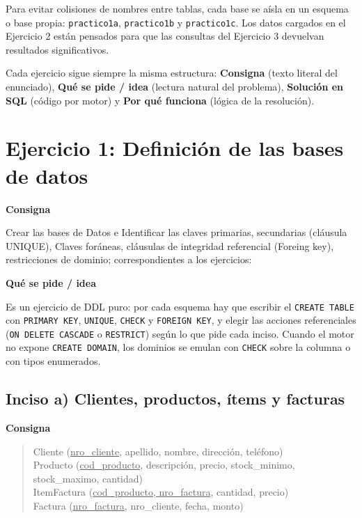 \documentclass[11pt,a4paper]{article}
\newcommand{\itemcabecera}[1]{\noindent\textbf{#1}\par\medskip}
\newcommand{\bloqueConsigna}{\itemcabecera{Consigna}}
\newcommand{\bloqueIdea}{\itemcabecera{Qu\'e se pide / idea}}
\newenvironment{esquema}{%
    \begin{quote}\ttfamily\small\setlength{\parskip}{0pt}\setlength{\parindent}{0pt}%
}{\end{quote}}
\begin{document}
Para evitar colisiones de nombres entre tablas, cada base se aísla en un esquema o base propia: \texttt{practico1a}, \texttt{practico1b} y \texttt{practico1c}. Los datos cargados en el Ejercicio 2 están pensados para que las consultas del Ejercicio 3 devuelvan resultados significativos.

Cada ejercicio sigue siempre la misma estructura: \textbf{Consigna} (texto literal del enunciado), \textbf{Qué se pide / idea} (lectura natural del problema), \textbf{Solución en SQL} (código por motor) y \textbf{Por qué funciona} (lógica de la resolución).

\section{Ejercicio 1: Definición de las bases de datos}

\bloqueConsigna

Crear las bases de Datos e Identificar las claves primarias, secundarias (cláusula UNIQUE), Claves foráneas, cláusulas de integridad referencial (Foreing key), restricciones de dominio; correspondientes a los ejercicios:

\bloqueIdea

Es un ejercicio de DDL puro: por cada esquema hay que escribir el \texttt{CREATE TABLE} con \texttt{PRIMARY KEY}, \texttt{UNIQUE}, \texttt{CHECK} y \texttt{FOREIGN KEY}, y elegir las acciones referenciales (\texttt{ON DELETE CASCADE} o \texttt{RESTRICT}) según lo que pide cada inciso. Cuando el motor no expone \texttt{CREATE DOMAIN}, los dominios se emulan con \texttt{CHECK} sobre la columna o con tipos enumerados.

\subsection{Inciso a) Clientes, productos, ítems y facturas}

\bloqueConsigna

\begin{esquema}
Cliente (\underline{nro\_cliente}, apellido, nombre, direcci\'on, tel\'efono)\\
Producto (\underline{cod\_producto}, descripci\'on, precio, stock\_minimo, stock\_maximo, cantidad)\\
ItemFactura (\underline{cod\_producto, nro\_factura}, cantidad, precio)\\
Factura (\underline{nro\_factura}, nro\_cliente, fecha, monto)
\end{esquema}
\end{document}
